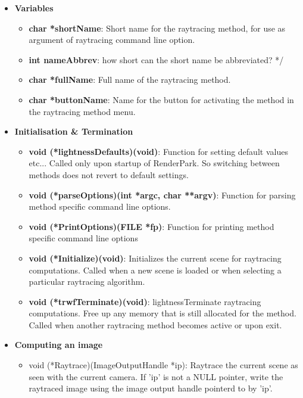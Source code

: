 \documentclass[11pt]{report}
\begin{document}
\begin{itemize}

\item{\bf Variables}
\begin{itemize}
\item {\bf char *shortName}: Short name for the raytracing method, for use 
	as argument of raytracing command line option.

\item {\bf int nameAbbrev}:  how short can the short name be abbreviated? */

\item {\bf char *fullName}:  Full name of the raytracing method.

\item {\bf char *buttonName}: Name for the button for activating the method 
	in the raytracing method menu.
\end{itemize}

\item{\bf Initialisation \& Termination}
\begin{itemize}
\item {\bf void (*lightnessDefaults)(void)}: Function for setting default values etc...
	Called only upon startup of RenderPark. So switching between methods
	does not revert to default settings.

\item {\bf void (*parseOptions)(int *argc, char **argv)}: Function for parsing
	method specific command line options.

\item {\bf void (*PrintOptions)(FILE *fp)}: Function for printing method 
	specific command line options

\item {\bf void (*Initialize)(void)}: Initializes the current scene for 
	raytracing computations.  Called when a new scene is loaded or
	when selecting a particular raytracing algorithm.

\item{\bf void (*trwfTerminate)(void)}: lightnessTerminate raytracing computations. Free up any
	memory that is still allocated for the method. Called when another
	raytracing method becomes active or upon exit.
\end{itemize}


\item{\bf Computing an image}
\begin{itemize}

\item {void (*Raytrace)(ImageOutputHandle *ip)}: Raytrace the current 
	scene as seen with the current camera. If 'ip' is not a NULL
	pointer, write the raytraced image using the image output
	handle pointerd to by 'ip'.


\end{itemize}
\end{itemize}
\end{document}
